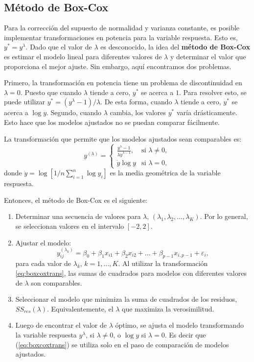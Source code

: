 \documentclass[
]{article}
\providecommand{\tightlist}{%
  \setlength{\itemsep}{0pt}\setlength{\parskip}{0pt}}
\begin{document}
\hypertarget{muxe9todo-de-box-cox}{%
\subsection{Método de Box-Cox}\label{muxe9todo-de-box-cox}}

Para la corrección del supuesto de normalidad y varianza constante, es posible implementar transformaciones en potencia para la variable respuesta. Esto es, \(y^{*}=y^{\lambda}\). Dado que el valor de \(\lambda\) es desconocido, la idea del \textbf{método de Box-Cox} es estimar el modelo lineal para diferentes valores de \(\lambda\) y determinar el valor que proporciona el mejor ajuste. Sin embargo, aquí encontramos dos problemas.

Primero, la transformación en potencia tiene un problema de discontinuidad en \(\lambda=0\). Puesto que cuando \(\lambda\) tiende a cero, \(y^{*}\) se acerca a \(1\). Para resolver esto, se puede utilizar \(y^{*} = (y^{\lambda}-1)/\lambda\). De esta forma, cuando \(\lambda\) tiende a cero, \(y^{*}\) se acerca a \(\log y\). Segundo, cuando \(\lambda\) cambia, los valores \(y^{*}\) varía drásticamente. Esto hace que los modelos ajustados no se puedan comparar fácilmente.

La transformación que permite que los modelos ajustados sean comparables es:
\begin{equation}
y^{(\lambda)} = \begin{cases}
\frac{y^{\lambda}-1}{\lambda \dot{y}^{\lambda-1}}, & \mbox{si }\lambda \neq 0, \\
\dot{y}\log y & \mbox{si } \lambda=0,
\end{cases}
\label{eq:boxcoxtrans}
\end{equation}
donde \(\dot{y} = \log \left[1/n \sum_{i=1}^{n}\log y_{i}\right]\) es la media geométrica de la variable respuesta.

Entonces, el método de Box-Cox es el siguiente:

\begin{enumerate}
\def\labelenumi{\arabic{enumi}.}
\tightlist
\item
  Determinar una secuencia de valores para \(\lambda\), \((\lambda_{1},\lambda_{2},\ldots,\lambda_{K})\). Por lo general, se seleccionan valores en el intervalo \([-2,2]\).
\item
  Ajustar el modelo:
  \[
  y_{ij}^{(\lambda_k)} = \beta_{0} + \beta_{1}x_{i1} + \beta_{2}x_{i2} + \ldots + \beta_{p-1}x_{i,p-1} + \varepsilon_{i},
  \]
  para cada valor de \(\lambda_{k}\), \(k=1,\ldots,K\). Al utilizar la transformación \eqref{eq:boxcoxtrans}, las sumas de cuadrados para modelos con diferentes valores de \(\lambda\) son comparables.
\item
  Seleccionar el modelo que minimiza la suma de cuadrados de los residuos, \(SS_{res}(\lambda)\). Equivalentemente, el \(\lambda\) que maximiza la verosimilitud.
\item
  Luego de encontrar el valor de \(\lambda\) óptimo, se ajusta el modelo transformando la variable respuesta \(y^{\lambda}\), si \(\lambda\neq 0\), o \(\log y\) si \(\lambda =0\). Es decir que (\ref{eq:boxcoxtrans}) se utiliza solo en el paso de comparación de modelos ajustados.
\end{enumerate}
\end{document}
